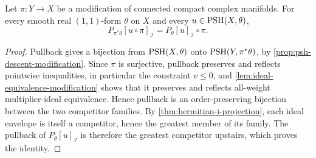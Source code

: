 \begin{proposition}\label{prop:i-envelope-modification}
Let $\pi\colon Y\to X$ be a modification of connected compact complex manifolds. For every smooth real $(1,1)$-form $\theta$ on $X$ and every $u\in\mathrm{PSH}(X,\theta)$,
\[
 P_{\pi^*\theta}[u\circ\pi]_{\mathcal I}
       =P_\theta[u]_{\mathcal I}\circ\pi.
\]
\end{proposition}
\begin{proof}
Pullback gives a bijection from $\mathrm{PSH}(X,\theta)$ onto $\mathrm{PSH}(Y,\pi^*\theta)$, by \cref{prop:psh-descent-modification}. Since $\pi$ is surjective, pullback preserves and reflects pointwise inequalities, in particular the constraint $v\leq0$, and \cref{lem:ideal-equivalence-modification} shows that it preserves and reflects all-weight multiplier-ideal equivalence. Hence pullback is an order-preserving bijection between the two competitor families. By \cref{thm:hermitian-i-projection}, each ideal envelope is itself a competitor, hence the greatest member of its family. The pullback of $P_\theta[u]_{\mathcal I}$ is therefore the greatest competitor upstairs, which proves the identity.
\end{proof}
